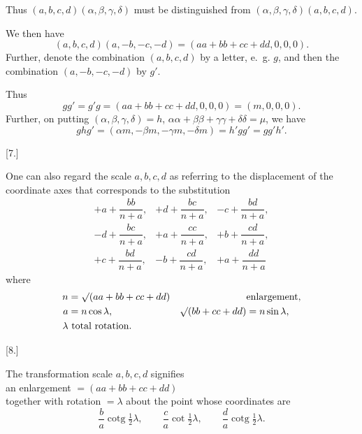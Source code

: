 %
\noindent Thus $(a,b,c,d)(\alpha,\beta,\gamma,\delta)$ must be distinguished from $(\alpha,\beta,\gamma,\delta)(a,b,c,d)$.

We then have
\[
(a,b,c,d)(a,-b,-c,-d)=(aa+bb+cc+dd,0,0,0).
\]
Further, denote the combination $(a,b,c,d)$ by a letter, e.~g. $g$, and then the combination $(a,-b,-c,-d)$ by $g'$.

Thus
\[
gg'=g'g=(aa+bb+cc+dd,0,0,0)=(m,0,0,0).
\]
Further, on putting $(\alpha,\beta,\gamma,\delta)=h$, $\alpha\alpha+\beta\beta+\gamma\gamma+\delta\delta=\mu$, we have
\[
ghg'=(\alpha m,-\beta m,-\gamma m,-\delta m)=h'gg'=gg'h'.
\]

\begin{center}[7.]\end{center}

One can also regard the scale $a,b,c,d$ as referring to the displacement of the coordinate axes that corresponds to the substitution
\[
\begin{array}{ccc}
+a+\dfrac{bb}{n+a},&+d+\dfrac{bc}{n+a},&-c+\dfrac{bd}{n+a},\\[6pt]
-d+\dfrac{bc}{n+a},&+a+\dfrac{cc}{n+a},&+b+\dfrac{cd}{n+a},\\[6pt]
+c+\dfrac{bd}{n+a},&-b+\dfrac{cd}{n+a},&+a+\dfrac{dd}{n+a}
\end{array}
\]
where
\[
\begin{aligned}
n&=\mathord{\surd}(aa+bb+cc+dd)&&\text{enlargement,}\\
a&=n\cos\lambda,&\mathord{\surd}(bb+cc+dd)&=n\sin\lambda,\\
\lambda&\text{ total rotation.}
\end{aligned}
\]

\begin{center}[8.]\end{center}

The transformation scale $a,b,c,d$ signifies\\
an enlargement $=(aa+bb+cc+dd)$\\
together with rotation $=\lambda$ about the point whose coordinates are
\[
\frac ba\operatorname{cotg}\tfrac12\lambda,\qquad
\frac ca\cot\tfrac12\lambda,\qquad
\frac da\operatorname{cotg}\tfrac12\lambda.
\]
